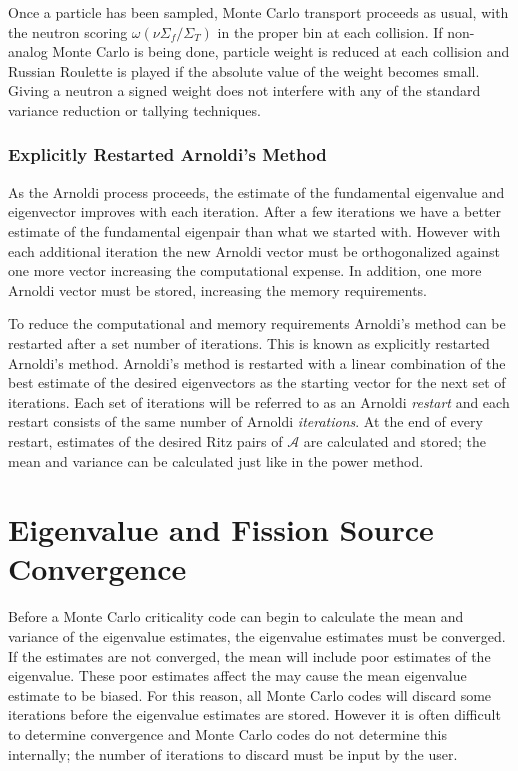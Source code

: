 \documentclass[12]{ansnse}
\newcommand{\A}{\ensuremath{\mathcal{A}}}
\begin{document}
\begin{doublespace}
Once a particle has been sampled, Monte Carlo transport proceeds as usual, with the neutron scoring $\omega\left(\nu\Sigma_f/\Sigma_T\right)$ in the proper bin at each collision.  If non-analog Monte Carlo is being done, particle weight is reduced at each collision and Russian Roulette is played if the absolute value of the weight becomes small.  Giving a neutron a signed weight does not interfere with any of the standard variance reduction or tallying techniques.

\subsubsection{Explicitly Restarted Arnoldi's Method}
As the Arnoldi process proceeds, the estimate of the fundamental eigenvalue and eigenvector improves with each iteration.  After a few iterations we have a better estimate of the fundamental eigenpair than what we started with.  However with each additional iteration the new Arnoldi vector must be orthogonalized against one more vector increasing the computational expense.  In addition, one more Arnoldi vector must be stored, increasing the memory requirements.  

To reduce the computational and memory requirements Arnoldi's method can be restarted\cite{Saad:1980Varia-0} after a set number of iterations.  This is known as explicitly restarted Arnoldi's method.  Arnoldi's method is restarted with a linear combination of the best estimate of the desired eigenvectors as the starting vector for the next set of iterations.  Each set of iterations will be referred to as an Arnoldi \emph{restart} and each restart consists of the same number of Arnoldi \emph{iterations}.  At the end of every restart, estimates of the desired Ritz pairs of \A{} are calculated and stored; the mean and variance can be calculated just like in the power method.  

\section{Eigenvalue and Fission Source Convergence}\label{sec:Convergence}
Before a Monte Carlo criticality code can begin to calculate the mean and variance of the eigenvalue estimates, the eigenvalue estimates must be converged.  If the estimates are not converged, the mean will include poor estimates of the eigenvalue.  These poor estimates affect the may cause the mean eigenvalue estimate to be biased.  For this reason, all Monte Carlo codes\cite{Team:2002MCNP--0} will discard some iterations before the eigenvalue estimates are stored.  However it is often difficult to determine convergence and Monte Carlo codes do not determine this internally; the number of iterations to discard must be input by the user.


\end{doublespace}
\end{document}
